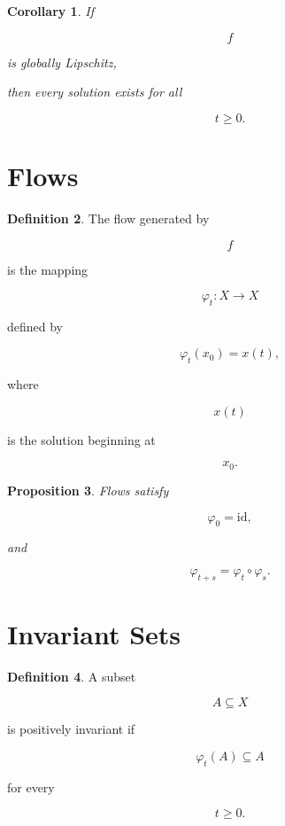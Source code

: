 \documentclass[11pt]{book}
\numberwithin{equation}{chapter}
\theoremstyle{definition}
\newtheorem{definition}{Definition}[chapter]
\theoremstyle{plain}
\newtheorem{proposition}[definition]{Proposition}
\newtheorem{corollary}[definition]{Corollary}
\begin{document}

\begin{corollary}

If

\[
f
\]

is globally Lipschitz,

then every solution exists for all

\[
t\ge0.
\]

\end{corollary}


\section{Flows}

\begin{definition}

The flow generated by

\[
f
\]

is the mapping

\[
\varphi_t:X\rightarrow X
\]

defined by

\[
\varphi_t(x_0)=x(t),
\]

where

\[
x(t)
\]

is the solution beginning at

\[
x_0.
\]

\end{definition}


\begin{proposition}

Flows satisfy

\[
\varphi_0
=
\mathrm{id},
\]

and

\[
\varphi_{t+s}
=
\varphi_t
\circ
\varphi_s.
\]

\end{proposition}


\section{Invariant Sets}

\begin{definition}

A subset

\[
A\subseteq X
\]

is positively invariant if

\[
\varphi_t(A)
\subseteq
A
\]

for every

\[
t\ge0.
\]

\end{definition}
\end{document}
